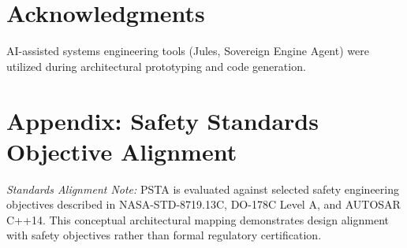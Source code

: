 \documentclass[conference]{IEEEtran}
\begin{document}
\section*{Acknowledgments}
AI-assisted systems engineering tools (Jules, Sovereign Engine Agent) were utilized during architectural prototyping and code generation.

\section*{Appendix: Safety Standards Objective Alignment}
\textit{Standards Alignment Note:} PSTA is evaluated against selected safety engineering objectives described in NASA-STD-8719.13C, DO-178C Level A, and AUTOSAR C++14. This conceptual architectural mapping demonstrates design alignment with safety objectives rather than formal regulatory certification.
\end{document}
